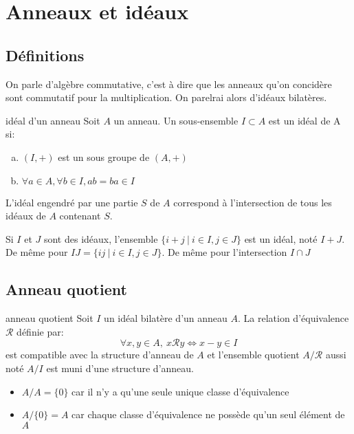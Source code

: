 \section{Anneaux et idéaux}

\subsection{Définitions}

On parle d'algèbre commutative, c'est à dire que les anneaux qu'on concidère sont
commutatif pour la multiplication. On parelrai alors d'idéaux bilatères.

\begin{definition}{idéal d'un anneau}{}
    Soit $A$ un anneau. Un sous-ensemble $I \subset A$ est un idéal de A si:
    \begin{enumerate}[(a)]
        \item $(I, +)$ est un sous groupe de $(A, +)$
        \item $\forall a \in A, \forall b \in I, ab = ba \in I$
    \end{enumerate}
\end{definition}

\begin{proposition}{}{}
    L'idéal engendré par une partie $S$ de $A$ correspond à l'intersection de tous les
    idéaux de $A$ contenant $S$.
\end{proposition}

    
Si $I$ et $J$ sont des idéaux, l'ensemble $\{i + j ~ | ~ i \in I, j \in J\}$ est un idéal,
noté $I+J$. De même pour $IJ = \{ij ~ | ~ i \in I, j \in J\}$. 
De même pour l'intersection $I \cap J$



\subsection{Anneau quotient}

\begin{definition}{anneau quotient}{}
    Soit $I$ un idéal bilatère d'un anneau $A$. La relation d'équivalence $\mathcal{R}$ définie par:
    \[ \forall x, y \in A, ~ x \mathcal{R} y \Longleftrightarrow x - y \in I \]
    est compatible avec la structure d'anneau de $A$ et l'ensemble quotient $A/\mathcal{R}$
    aussi noté $A/I$ est muni d'une structure d'anneau.
\end{definition}

\begin{example}{}{}
    \begin{itemize}
        \item $A / A = \{0\}$ car il n'y a qu'une seule unique classe d'équivalence
        \item $A / \{0\} = A$ car chaque classe d'équivalence ne possède qu'un seul élément de $A$
    \end{itemize}
\end{example}


